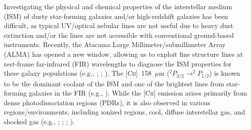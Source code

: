 \documentclass[apj]{emulateapj}
\begin{document}
Investigating the physical and chemical properties of the interstellar medium (ISM) of dusty star-forming galaxies and/or high-redshift galaxies has been difficult, as typical UV/optical nebular lines are not useful due to heavy dust extinction and/or the lines are not accessible with conventional ground-based instruments.
Recently, the Atacama Large Millimeter/submillimeter Array (ALMA) has opened a new window, allowing us to exploit fine structure lines at rest-frame far-infrared (FIR) wavelengths to diagnose the ISM properties for these galaxy populations (e.g., \citealt{2012A&A...542L..34N}; \citealt{2014ApJ...782L..17D}; \citealt{2016Sci...352.1559I}).
The [\textsc{Cii}]~158~$\mu$m ($^2P_{3/2}\rightarrow^2P_{1/2}$) is known to be the dominant coolant of the ISM and one of the brightest lines from star-forming galaxies in the FIR (e.g., \citealt{1996A&A...308..723I}).
While the [\textsc{Cii}] emission arises primarily from dense photodissociation regions (PDRs),  it is also observed in various regions/environments, including ionized regions, cool, diffuse interstellar gas, and shocked gas (e.g., \citealt{1991ApJ...373..423S}; \citealt{1993ApJ...407..579M}; \citealt{2011A&A...526A.149N}; \citealt{2013ApJ...777...66A}). 
\end{document}
